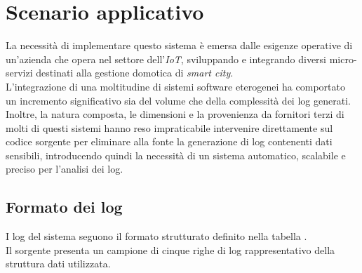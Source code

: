 \documentclass[12pt]{report}
\begin{document}
\section{Scenario applicativo}
\label{sec:scenario_applicativo}
La necessità di implementare questo sistema è emersa dalle esigenze operative di un'azienda che opera nel settore dell'\textit{IoT}, sviluppando e integrando diversi micro-servizi destinati alla gestione domotica di \textit{smart city}. \\
L'integrazione di una moltitudine di sistemi software eterogenei ha comportato un incremento significativo sia del volume che della complessità dei log generati. \\
Inoltre, la natura composta, le dimensioni e la provenienza da fornitori terzi di molti di questi sistemi hanno reso impraticabile intervenire direttamente sul codice sorgente per eliminare alla fonte la generazione di log contenenti dati sensibili, introducendo quindi la necessità di un sistema automatico, scalabile e preciso per l'analisi dei log.

\clearpage

\subsection{Formato dei log}
\label{subsec:formato_log}

I log del sistema seguono il formato strutturato definito nella tabella . \\
Il sorgente  presenta un campione di cinque righe di log rappresentativo della struttura dati utilizzata.
\end{document}
